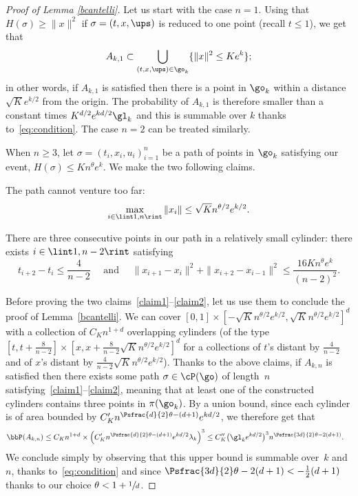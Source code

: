 \begin{proof}[Proof of Lemma \ref{bcantelli}]
Let us start with the case $n=1$.
Using that $H(\sigma) \geq \|x\|^2$ if $\sigma =(t,x,\ups)$ is reduced to one point (recall $t\leq 1$), we get that
\[
A_{k,1} \subset \bigcup_{(t,x,\ups) \in \go_k} \{ \|x\|^2 \leq Ke^{k} \};
\]
in other words, if $A_{k,1}$ is satisfied then there
is a point in $\go_k$ within a distance $\sqrt{K} e^{k/2}$ from the origin.
The probability
of $A_{k,1}$ is therefore smaller than a constant times $ K^{d/2} e^{ kd /2} \gl_k$ and this is summable over $k$ thanks to~\eqref{eq:condition}. The case $n=2$ can be treated similarly.

When $n\ge 3$, let $\sigma = (t_i,x_i,u_i)_{i=1}^n$ be a path of points in
$\go_k$ satisfying our event, \ie $H(\sigma) \leq K n^{\theta} e^{k}$.
We make the two following claims.

\setcounter{claim}{0}
\begin{claim}
The path cannot venture too far:
\begin{equation}\label{claim1}
\max_{i\in \lint 1, n\rint} \|x_i\| \le \sqrt{K} n^{\theta/2} e^{k/2}.
\end{equation}
\end{claim}

\begin{claim}
There are three consecutive points in our path in a relatively small cylinder:
there exists $i \in \lint 1,n-2\rint$ satisfying
\begin{equation}\label{claim2}
t_{i+2}-t_i\le \frac{4}{n-2} \quad \text{ and } \quad
\|x_{i+1}-x_i \|^2+\|x_{i+2}-x_{i-1} \|^2
\le
\frac{16 K n^{\theta}e^{k}}{(n-2)^2}.
\end{equation}
\end{claim}

Before proving the two claims~\eqref{claim1}--\eqref{claim2},
let us use them to conclude the proof of Lemma~\ref{bcantelli}.
We can cover
$[0,1] \times [ - \sqrt{K} n^{\theta/2} e^{k/2}, \sqrt{K} n^{\theta/2} e^{k/2} ]^d$
with a collection of
$C_{K} n^{1+d}$ overlapping cylinders
(of the type $[t,t+\frac{8}{n-2}] \times [x,x+ \frac{8 }{n-2}\sqrt{K} n^{\theta/2} e^{k/2} ]^{d}$ for a collections of $t$'s distant by $\frac{4}{n-2}$ and of $x$'s distant by $\frac{4 }{n-2}\sqrt{K} n^{\theta/2} e^{k/2}$).
Thanks to the above claims,
if $A_{k,n}$ is satisfied
then there exists some path $\sigma \in \cP(\go)$
of length~$n$
satisfying~\eqref{claim1}--\eqref{claim2}, meaning that
at least one of the constructed cylinders contains
three points in $\pi(\go_k)$.
By a union bound, since
each cylinder is of area bounded by $C'_{K} n^{\Psfrac{d}{2} \theta -(d+1)} e^{kd/2}$, we therefore get that
\begin{align*}
\bbP(A_{k,n}) &\leq C_{K} n^{1+d} \times \Bigl(C'_{K} n^{\Psfrac{d}{2} \theta - (d+1) } e^{kd/2} \lambda_k\Bigr)^3
\leq C''_{K} \bigl(\gl_k e^{kd/2} \bigr)^3 n^{\Psfrac{3d}{2}\theta-2(d+1)}.
\end{align*}
We conclude simply by observing that this upper bound is summable over~$k$ and~$n$, thanks to~\eqref{eq:condition}
and since $\Psfrac{3d}{2}\theta-2(d+1) < -\frac12 (d+1)$ thanks to our choice $\theta<1+\sfrac{1}{d}$.


\end{proof}
